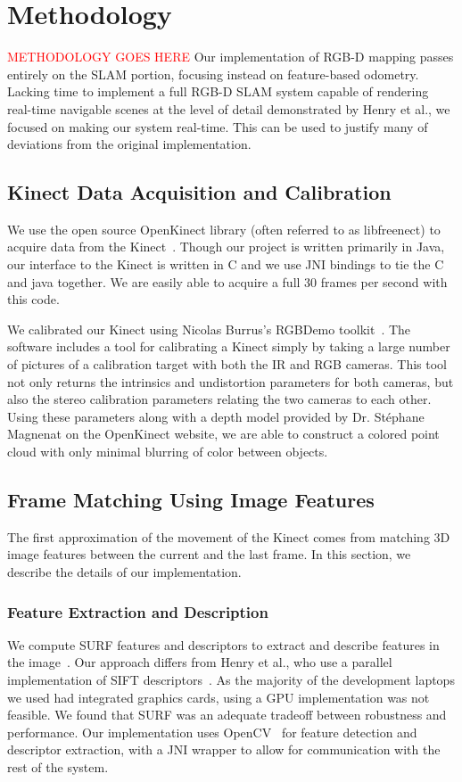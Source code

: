 \documentclass[letterpaper, 10pt, conference]{ieeeconf}
\newcommand{\xxx}[1]{\textcolor{red}{#1}}
\begin{document}
\section{Methodology}
\xxx{METHODOLOGY GOES HERE}
Our implementation of RGB-D mapping passes entirely on the SLAM portion,
focusing instead on feature-based odometry. Lacking time to implement a
full RGB-D SLAM system capable of rendering real-time navigable scenes at the
level of detail demonstrated by Henry et al., we focused on making our system
real-time. This can be used to justify many of deviations from the original
implementation.

\subsection{Kinect Data Acquisition and Calibration}
We use the open source OpenKinect library (often referred to as libfreenect)
to acquire data from the Kinect~\cite{OpenKinect}. Though our project is
written primarily in Java, our interface to the Kinect is written in C and we
use JNI bindings to tie the C and java together. We are easily able to acquire
a full 30 frames per second with this code.

We calibrated our Kinect using Nicolas Burrus's RGBDemo
toolkit~\cite{BurrusCalibration}. The software includes a tool for calibrating
a Kinect simply by taking a large number of pictures of a calibration target
with both the IR and RGB cameras. This tool not only returns the intrinsics
and undistortion parameters for both cameras, but also the stereo calibration
parameters relating the two cameras to each other. Using these parameters
along with a depth model provided by Dr. St\'{e}phane Magnenat on the
OpenKinect website, we are able to construct a colored point cloud with only
minimal blurring of color between objects.

\subsection{Frame Matching Using Image Features}
The first approximation of the movement of the Kinect comes from matching 3D image
features between the current and the last frame. In this section, we describe the details
of our implementation.

\subsubsection{Feature Extraction and Description}
We compute SURF features and descriptors
to extract and describe features in the image~\cite{Bay06surf}. Our approach differs
from Henry et al., who use a parallel implementation of SIFT descriptors~\cite{SIFTGPU}.
As the majority of the development laptops we used had integrated graphics cards, using
a GPU implementation was not feasible. We found that SURF was an adequate tradeoff
between robustness and performance. Our implementation uses OpenCV~\cite{opencv_library}
for feature detection and descriptor extraction, with a JNI wrapper to allow for
communication with the rest of the system.
\end{document}
